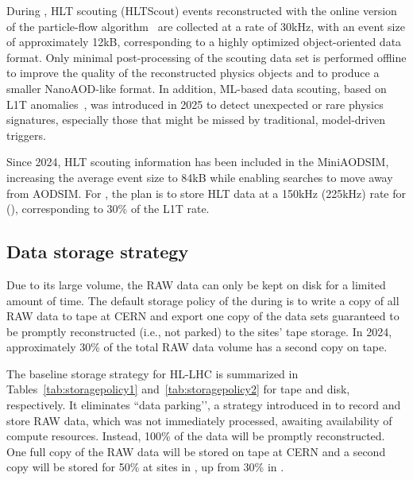 During \RunThree, \gls{HLT} scouting (HLTScout) events reconstructed with the online version of the particle-flow algorithm~\cite{CMS:2017yfk} are collected at a rate of 30\unit{kHz}, with an event size of approximately 12\unit{kB}, corresponding to a highly optimized object-oriented data format. Only minimal post-processing of the scouting data set is performed offline to improve the quality of the reconstructed physics objects and to produce a smaller NanoAOD-like format. In addition, ML-based data scouting, based on \gls{L1T} anomalies~\cite{CMS-DP-2024-059,CMS-DP-2024-121}, was introduced in 2025 to detect unexpected or rare physics signatures, especially those that might be missed by traditional, model-driven triggers.

Since 2024, HLT scouting information has been included in the MiniAODSIM, increasing the average event size to 84\unit{kB} while enabling searches to move away from AODSIM.
For \PhaseTwo, the plan is to store HLT data at a 150\unit{kHz} (225\unit{kHz}) rate for \RunFour (\RunFive), corresponding to 30\% of the \gls{L1T} rate.

\subsection{Data storage strategy}
\label{sec:datastorage}

Due to its large volume, the \gls{RAW} data can only be kept on disk for a limited amount of time. The default storage policy of the \TierZero during \RunThree is to write a copy of all \gls{RAW} data to tape at CERN and export one copy of the data sets guaranteed to be promptly reconstructed (i.e., not parked) to the \TierOne sites' tape storage. In 2024, approximately 30\% of the total \gls{RAW} data volume has a second copy on \TierOne tape.

The baseline storage strategy for \gls{HL-LHC} is summarized in Tables~\ref{tab:storagepolicy1} and~\ref{tab:storagepolicy2} for tape and disk, respectively.
It eliminates ``data parking’’, a strategy introduced in \RunOne to record and store \gls{RAW} data, which was not immediately processed, awaiting availability of compute resources. Instead, 100\% of the data will be promptly reconstructed.
One full copy of the \gls{RAW} data will be stored on tape at CERN and a second copy will be stored for 50\% at \TierOne sites in \PhaseTwo, up from 30\% in \RunThree.

